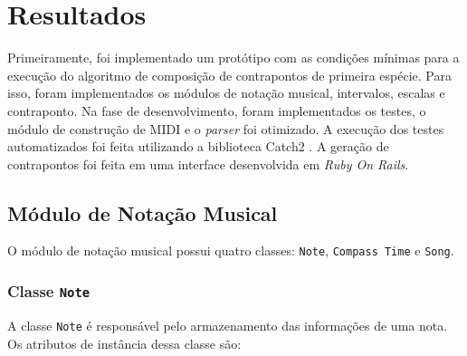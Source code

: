 \chapter[Resultados]{Resultados} \label{c3}

  Primeiramente, foi implementado um protótipo com as condições mínimas para a execução do algoritmo de composição de contrapontos de primeira espécie. Para isso, foram implementados os módulos de notação musical, intervalos, escalas e contraponto. Na fase de desenvolvimento, foram implementados os testes, o módulo de construção de MIDI e o \textit{parser} foi otimizado. A execução dos testes automatizados foi feita utilizando a biblioteca Catch2 \footnotemark {}. A geração de contrapontos foi feita em uma interface desenvolvida em \textit{Ruby On Rails}.

  \section[Módulo de Notação Musical]{Módulo de Notação Musical}

    O módulo de notação musical possui quatro classes: \texttt{Note}, \texttt{Compass Time} e \texttt{Song}.

    \subsection[Classe \texttt{Note}]{Classe \texttt{Note}}

      A classe \texttt{Note} é responsável pelo armazenamento das informações de uma nota. Os atributos de instância dessa classe são:

